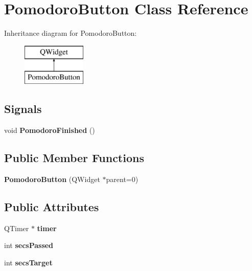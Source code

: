 \hypertarget{class_pomodoro_button}{}\section{Pomodoro\+Button Class Reference}
\label{class_pomodoro_button}
Inheritance diagram for Pomodoro\+Button\+:\begin{figure}[H]
\begin{center}
\leavevmode
\includegraphics[height=2.000000cm]{class_pomodoro_button}
\end{center}
\end{figure}
\subsection*{Signals}
\begin{DoxyCompactItemize}
\item 
\mbox{\label{class_pomodoro_button_ac2392efd371986fcb20c5b29562fcc46}} 
void {\bfseries Pomodoro\+Finished} ()
\end{DoxyCompactItemize}
\subsection*{Public Member Functions}
\begin{DoxyCompactItemize}
\item 
\mbox{\label{class_pomodoro_button_af566cac51b9c2ddba1b26ced5ed01de1}} 
{\bfseries Pomodoro\+Button} (Q\+Widget $\ast$parent=0)
\end{DoxyCompactItemize}
\subsection*{Public Attributes}
\begin{DoxyCompactItemize}
\item 
\mbox{\label{class_pomodoro_button_ab42338e4ce1e5d0f8acbe73565177e41}} 
Q\+Timer $\ast$ {\bfseries timer}
\item 
\mbox{\label{class_pomodoro_button_a6587b4babb2f78e4ee99de6c3bfd2e48}} 
int {\bfseries secs\+Passed}
\item 
\mbox{\label{class_pomodoro_button_a32cc630ba2b255bda7dfaf0b7209b79b}} 
int {\bfseries secs\+Target}
\end{DoxyCompactItemize}
